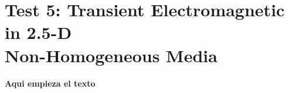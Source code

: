 \documentclass[../Dissertation]{subfiles}
\begin{document}
\section[Test 5: Transient Electromagnetic in 2.5D Non Homogeneous Media]{Test 5: Transient Electromagnetic in 2.5-D \protect\\ Non-Homogeneous Media}\label{sec5:3D2D_TEM}
  \textbf{Aqui empieza el texto} 
  \lipsum[1]

\end{document}
